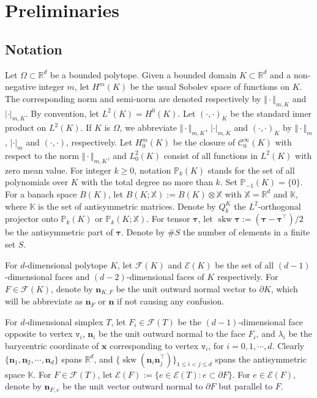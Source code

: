 \documentclass[10pt]{amsart}
\newcommand{\skw}{\operatorname{skw}}
\numberwithin{equation}{section}
\begin{document}
\section{Preliminaries}\label{sec:prelim}

\subsection{Notation}
Let $\Omega\subset \mathbb{R}^d$ be a bounded
polytope. Given a bounded domain $K\subset\mathbb{R}^{d}$ and a
non-negative integer $m$, let $H^m(K)$ be the usual Sobolev space of functions
on $K$.
The corresponding norm and semi-norm are denoted respectively by
$\Vert\cdot\Vert_{m,K}$ and $|\cdot|_{m,K}$. By convention, let $L^2(K)=H^0(K)$. 
Let $(\cdot, \cdot)_K$ be the standard inner product on $L^2(K)$. If $K$ is $\Omega$, we abbreviate
$\Vert\cdot\Vert_{m,K}$, $|\cdot|_{m,K}$ and $(\cdot, \cdot)_K$ by $\Vert\cdot\Vert_{m}$, $|\cdot|_{m}$ and $(\cdot, \cdot)$,
respectively. Let $H_0^m(K)$ be the closure of $\mathcal C_{0}^{\infty}(K)$ with
respect to the norm $\Vert\cdot\Vert_{m,K}$, and $L_0^2(K)$ consist of all functions in $L^2(K)$ with zero mean value.
For integer $k\geq0$,
notation $\mathbb P_k(K)$ stands for the set of all
polynomials over $K$ with the total degree no more than $k$. Set $\mathbb P_{-1}(K)=\{0\}$.
For a banach space $B(K)$, let $B(K; \mathbb{X}):=B(K)\otimes\mathbb{X}$ with $\mathbb{X}=\mathbb{R}^d$ and $\mathbb{K}$, where $\mathbb{K}$ is the set of antisymmetric matrices.
Denote by $Q_k^{K}$ the $L^2$-orthogonal projector onto $\mathbb P_k(K)$ or $\mathbb P_{k}(K; \mathbb{X})$.
For tensor $\boldsymbol{\tau}$, let $\skw\boldsymbol{\tau}:=(\boldsymbol{\tau}-\boldsymbol{\tau}^{\intercal})/2$ be the antisymmetric part of $\boldsymbol{\tau}$.
Denote by $\#S$ the number of elements in a finite set $S$.

For $d$-dimensional polytope $K$, let $\mathcal{F}(K)$ and $\mathcal{E}(K)$ be the set of all $(d-1)$-dimensional faces and $(d-2)$-dimensional faces of $K$ respectively. For $F\in\mathcal{F}(K)$, denote by $\boldsymbol{n}_{K,F}$ be the unit outward normal vector to $\partial K$, which will be abbreviate as $\boldsymbol{n}_F$ or $\boldsymbol{n}$ if not causing any confusion.

For $d$-dimensional simplex $T$,
let $F_i\in\mathcal F(T)$ be the $(d-1)$-dimensional face opposite to vertex $\texttt{v}_i$, $\boldsymbol n_i$ be the unit outward normal to the face $F_i$, and $\lambda_i$ be the barycentric coordinate of $\boldsymbol x$ corresponding to vertex $\texttt{v}_i$, for $i=0, 1, \cdots, d$.
Clearly $\{ \boldsymbol n_1, \boldsymbol n_2, \cdots, \boldsymbol n_d \}$ spans $\mathbb R^d$, and $\{\skw({\boldsymbol n_i\boldsymbol n_j^{\intercal}})\}_{1\leq i<j\leq d}$ spans the antisymmetric space $\mathbb K$. 
For $F\in\mathcal F(T)$, let $\mathcal{E}(F):=\{e\in\mathcal{E}(T): e\subset\partial F\}$.
For $e\in \mathcal E(F)$, denote by $\boldsymbol{n}_{F,e}$ be the unit vector outward normal to $\partial F$ but parallel to $F$.
\end{document}
